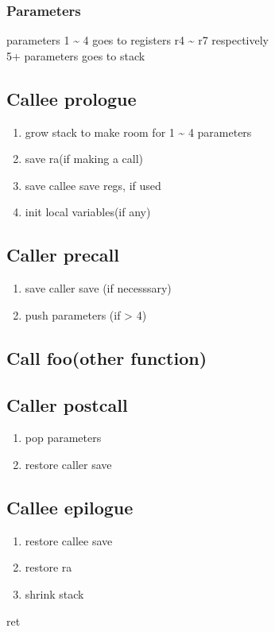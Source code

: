 \documentclass[11pt]{article}
\begin{document}
\subsubsection{Parameters}
\label{sec:orgheadline47}
parameters 1 \textasciitilde{} 4 goes to registers r4 \textasciitilde{} r7 respectively\\
5+ parameters goes to stack
\subsection{Callee prologue}
\label{sec:orgheadline49}
\begin{enumerate}
\item grow stack to make room for 1 \textasciitilde{} 4 parameters
\item save ra(if making a call)
\item save callee save regs, if used
\item init local variables(if any)
\end{enumerate}
\subsection{Caller precall}
\label{sec:orgheadline50}
\begin{enumerate}
\item save caller save (if necesssary)
\item push parameters (if > 4)
\end{enumerate}
\subsection{Call foo(other function)}
\label{sec:orgheadline51}
\subsection{Caller postcall}
\label{sec:orgheadline52}
\begin{enumerate}
\item pop parameters
\item restore caller save
\end{enumerate}
\subsection{Callee epilogue}
\label{sec:orgheadline53}
\begin{enumerate}
\item restore callee save
\item restore ra
\item shrink stack
\end{enumerate}
ret
\end{document}
